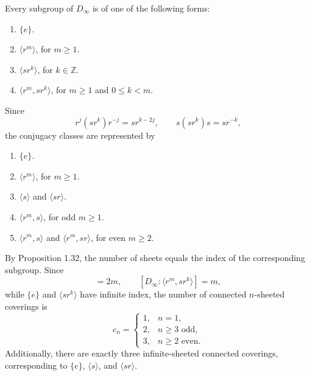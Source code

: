 \begin{solution}
		Every subgroup of $D_\infty$ is of one of the following forms:
		\begin{enumerate}
			\item $\{e\}$.
			\item $\langle r^m \rangle$, for $m \geq 1$.
			\item $\langle sr^k \rangle$, for $k \in \mathbb{Z}$.
			\item $\langle r^m, sr^k \rangle$, for $m \geq 1$ and
				$0 \leq k < m$.
		\end{enumerate}
		Since
		\begin{equation}
			r^j(sr^k)r^{-j} = sr^{k-2j},
			\qquad
			s(sr^k)s = sr^{-k},
		\end{equation}
		the conjugacy classes are represented by
		\begin{enumerate}
			\item $\{e\}$.
			\item $\langle r^m \rangle$, for $m \geq 1$.
			\item $\langle s \rangle$ and $\langle sr \rangle$.
			\item $\langle r^m,s \rangle$, for odd $m \geq 1$.
			\item $\langle r^m,s \rangle$ and $\langle r^m,sr \rangle$,
				for even $m \geq 2$.
		\end{enumerate}
		By Proposition 1.32, the number of sheets equals the
		index of the corresponding subgroup. Since
		\begin{equation}
			[D_\infty : \langle r^m \rangle] = 2m,
			\qquad
			[D_\infty : \langle r^m,sr^k \rangle] = m,
		\end{equation}
		while $\{e\}$ and $\langle sr^k \rangle$ have infinite
		index, the number of connected $n$-sheeted coverings is
		\begin{equation}
				c_n =
				\begin{cases}
					1, & n = 1,\\
					2, & n \geq 3 \text{ odd},\\
					3, & n \geq 2 \text{ even}.
				\end{cases}
		\end{equation}
		Additionally, there are exactly three infinite-sheeted
		connected coverings, corresponding to
		$\{e\}$, $\langle s \rangle$, and $\langle sr \rangle$.
	\end{solution}


